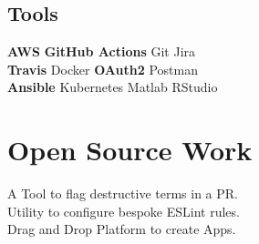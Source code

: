 \documentclass[]{deedy-resume-openfont}
\begin{document}
\begin{minipage}[t]{0.33\textwidth}
\subsection{Tools}
\textbf{AWS} \textbullet{} \textbf{GitHub Actions} \textbullet{} Git \textbullet{} Jira \\ 
\vspace{3pt}
\textbf{Travis} \textbullet{} Docker \textbullet{} \textbf{OAuth2} \textbullet{} Postman \\
\vspace{3pt}
\textbf{Ansible} \textbullet{} Kubernetes \textbullet{} Matlab \textbullet{} RStudio
\sectionsep

\section{Open Source Work}
A Tool to flag destructive terms in a PR.\\
\vspace{4pt}
Utility to configure bespoke ESLint rules.\\
\vspace{4pt}
Drag and Drop Platform to create Apps.\\
\sectionsep

%
%

\end{minipage}
\hfill
\end{document}
